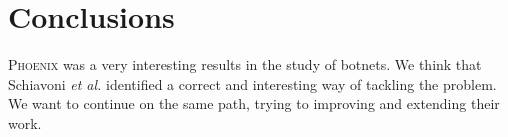\section{Conclusions}
\label{sec:conclusions_and_future_work}
\textsc{Phoenix} was a very interesting results in the study of botnets. We think that Schiavoni
\emph{et al.} identified a correct and interesting way of tackling the problem. We want to
continue on the same path, trying to improving and extending their work.

